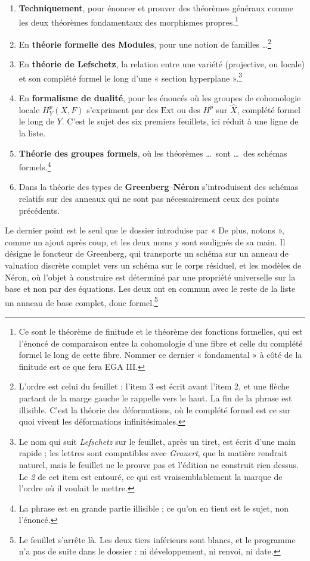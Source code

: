 \documentclass[11pt,a4paper]{article}
\begin{document}
\begin{enumerate}
\item[1)] \textbf{Techniquement}, pour énoncer et prouver des théorèmes
  généraux comme les deux théorèmes fondamentaux des morphismes
  propres.\footnote{Ce sont le théorème de finitude et le théorème des
  fonctions formelles, qui est l'énoncé de comparaison entre la
  cohomologie d'une fibre et celle du complété formel le long de cette fibre.
  Nommer ce dernier « fondamental » à côté de la finitude est ce que fera
  EGA III.}
\item[3)] En \textbf{théorie formelle des Modules}, pour une notion de
  familles \ldots\footnote{L'ordre est celui du feuillet : l'item 3 est écrit
  avant l'item 2, et une flèche partant de la marge gauche le rappelle vers le
  haut. La fin de la phrase est illisible. C'est la théorie des déformations,
  où le complété formel est ce sur quoi vivent les déformations
  infinitésimales.}
\item[2)] En \textbf{théorie de Lefschetz}, la relation entre une variété
  (projective, ou locale) et son complété formel le long d'une « section
  hyperplane ».\footnote{Le nom qui suit \emph{Lefschetz} sur le feuillet,
  après un tiret, est écrit d'une main rapide ; les lettres sont compatibles
  avec \emph{Grauert}, que la matière rendrait naturel, mais le feuillet ne le
  prouve pas et l'édition ne construit rien dessus. Le \emph{2} de cet item est
  entouré, ce qui est vraisemblablement la marque de l'ordre où il voulait le
  mettre.}
\item[4)] En \textbf{formalisme de dualité}, pour les énoncés où les groupes de
  cohomologie locale $H^{p}_{Y}(X, F)$ s'expriment par des $\mathrm{Ext}$ ou
  des $H^{p}$ sur $\widehat{X}$, complété formel le long de $Y$. C'est le sujet
  des six premiers feuillets, ici réduit à une ligne de la liste.
\item[5)] \textbf{Théorie des groupes formels}, où les théorèmes \ldots\ sont
  \ldots\ des schémas formels.\footnote{La phrase est en grande partie
  illisible ; ce qu'on en tient est le sujet, non l'énoncé.}
\item[6)] Dans la théorie des types de \textbf{Greenberg}--\textbf{Néron}
  s'introduisent des schémas relatifs sur des anneaux qui ne sont pas
  nécessairement ceux des points précédents.
\end{enumerate}

Le dernier point est le seul que le dossier introduise par « De plus,
notons », comme un ajout après coup, et les deux noms y sont soulignés de sa
main. Il désigne le foncteur de Greenberg, qui transporte un schéma sur un
anneau de valuation discrète complet vers un schéma sur le corps résiduel, et
les modèles de Néron, où l'objet à construire est déterminé par une propriété
universelle sur la base et non par des équations. Les deux ont en commun avec le reste de
la liste un anneau de base complet, donc formel.\footnote{Le feuillet s'arrête là. Les deux tiers inférieurs sont
blancs, et le programme n'a pas de suite dans le dossier : ni développement,
ni renvoi, ni date.}
\end{document}
